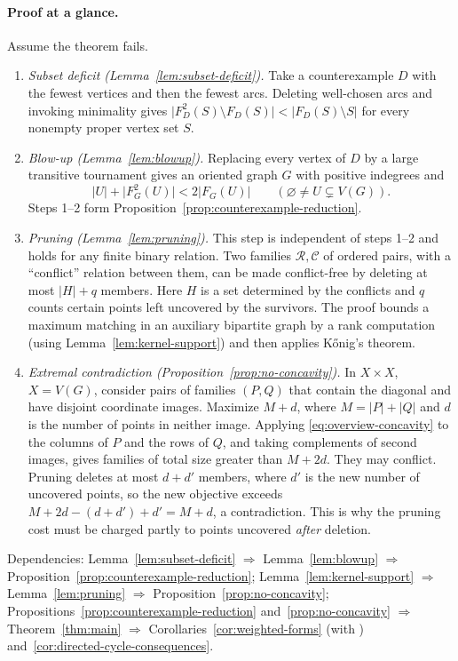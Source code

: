 \documentclass[11pt]{article}
\theoremstyle{remark}
\newcommand{\abs}[1]{\lvert #1\rvert}
\begin{document}
\paragraph{Proof at a glance.}
Assume the theorem fails.
\begin{enumerate}[label=\arabic*.,leftmargin=*]
\item \emph{Subset deficit (Lemma~\ref{lem:subset-deficit}).}
Take a counterexample $D$ with the fewest vertices and then the fewest arcs.
Deleting well-chosen arcs and invoking minimality gives
$\abs{F_D^2(S)\setminus F_D(S)}<\abs{F_D(S)\setminus S}$ for every nonempty
proper vertex set $S$.
\item \emph{Blow-up (Lemma~\ref{lem:blowup}).}
Replacing every vertex of $D$ by a large transitive tournament gives an
oriented graph $G$ with positive indegrees and
\begin{equation}\label{eq:overview-concavity}
 \abs{U}+\abs{F_G^2(U)}<2\abs{F_G(U)}\qquad(\varnothing\ne U\subsetneq V(G)).
\end{equation}
Steps 1--2 form Proposition~\ref{prop:counterexample-reduction}.
\item \emph{Pruning (Lemma~\ref{lem:pruning}).}
This step is independent of steps 1--2 and holds for any finite binary
relation.  Two families $\mathcal R,\mathcal C$ of ordered pairs, with a
``conflict'' relation between them, can be made conflict-free by deleting at
most $\abs H+q$ members.  Here $H$ is a set determined by the conflicts and
$q$ counts certain points left uncovered by the survivors.  The proof bounds
a maximum matching in an auxiliary bipartite graph by a rank computation
(using Lemma~\ref{lem:kernel-support}) and then applies K\H{o}nig's theorem.
\item \emph{Extremal contradiction (Proposition~\ref{prop:no-concavity}).}
In $X\times X$, $X=V(G)$, consider pairs of families $(P,Q)$ that contain the
diagonal and have disjoint coordinate images.  Maximize $M+d$, where
$M=\abs P+\abs Q$ and $d$ is the number of points in neither image.
Applying \eqref{eq:overview-concavity} to the columns of $P$ and the rows of
$Q$, and taking complements of second images, gives families of total size
greater than $M+2d$.  They may conflict.  Pruning deletes at most $d+d'$
members, where $d'$ is the new number of uncovered points, so the new
objective exceeds $M+2d-(d+d')+d'=M+d$, a contradiction.  This is why the
pruning cost must be charged partly to points uncovered \emph{after} deletion.
\end{enumerate}
Dependencies:
Lemma~\ref{lem:subset-deficit} $\Rightarrow$ Lemma~\ref{lem:blowup}
$\Rightarrow$ Proposition~\ref{prop:counterexample-reduction};
Lemma~\ref{lem:kernel-support} $\Rightarrow$ Lemma~\ref{lem:pruning}
$\Rightarrow$ Proposition~\ref{prop:no-concavity};
Propositions~\ref{prop:counterexample-reduction} and~\ref{prop:no-concavity}
$\Rightarrow$ Theorem~\ref{thm:main} $\Rightarrow$
Corollaries~\ref{cor:weighted-forms} (with \cite{Seacrest2015})
and~\ref{cor:directed-cycle-consequences}.
\end{document}
